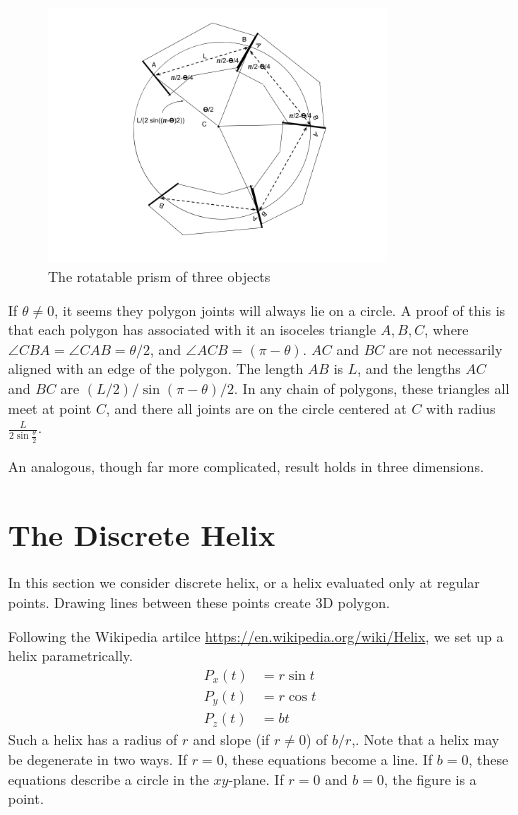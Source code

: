 \documentclass[11pt]{article}
\begin{document}
\begin{figure}
     \centering
     \includegraphics[width=0.80\textwidth]{figures/2DPolygonStacking.png}
     \caption{The rotatable prism of three objects}
  \label{fig:prismdiagram}
\end{figure}

If $\theta \neq 0$, it seems they polygon joints will always lie on a circle. A proof of this
is that each polygon has associated with it an isoceles triangle $A,B,C$, where $\angle CBA = \angle CAB = \theta/2$,
and $\angle ACB = (\pi - \theta)$. $AC$ and $BC$ are not necessarily aligned with an edge of the polygon.
The length $AB$ is $L$, and the lengths $AC$ and $BC$ are
$(L/2) / \sin{(\pi - \theta)/2}$. In any chain of polygons, these triangles all meet at point $C$, and there all
joints are on the circle centered at $C$ with radius $\frac{L}{2 \sin{\frac{\theta}{2}}}$.

An analogous, though far more complicated, result holds in three dimensions.

\label{sec:2d}
\section{The Discrete Helix}

In this section we consider discrete helix, or a helix evaluated only at regular points. Drawing lines between these
points create 3D polygon.

Following the Wikipedia artilce \url{https://en.wikipedia.org/wiki/Helix}, we set up a helix parametrically.
\begin{align*}
    P_x(t) &= r \sin{t}  \\
    P_y(t) &= r \cos{t} \\
   P_z(t) &= b t
\end{align*}
Such a helix has a radius of $r$ and slope (if $r \neq 0$) of $b/r$,. Note that a helix may be degenerate in two ways.
If $r = 0$, these equations become a line. If $b = 0$, these equations describe a circle in the $xy$-plane.
If $r = 0$ and $b = 0$, the figure is a point.
\end{document}
